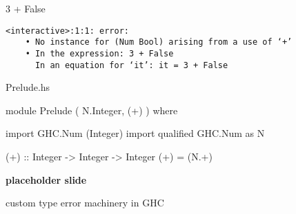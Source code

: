 



\begin{frame}[fragile]

\Large
\begin{texttt}
3 + False
\end{texttt}
\nl

\large
\begin{block}{}
\begin{Verbatim}
<interactive>:1:1: error:
    • No instance for (Num Bool) arising from a use of ‘+’
    • In the expression: 3 + False
      In an equation for ‘it’: it = 3 + False
\end{Verbatim}
\end{block}
\end{frame}


\begin{frame}[fragile]

\begin{block}{Prelude.hs}
\begin{haskellcode}
module Prelude
  ( N.Integer, (+)
  )
where

import GHC.Num (Integer)
import qualified GHC.Num as N

(+) :: Integer -> Integer -> Integer
(+) = (N.+)
\end{haskellcode}
\end{block}
\end{frame}



\begin{frame}

{\bf placeholder slide}

custom type error machinery in GHC

\end{frame}


